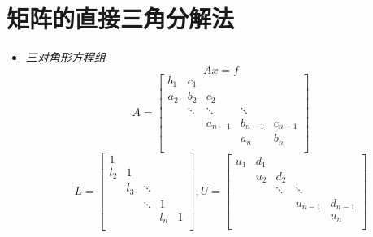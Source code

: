 \documentclass[twoside]{article}
\begin{document}
\section{矩阵的直接三角分解法}
\begin{itemize}
  \item \textit{三对角形方程组}
    \begin{equation}
      Ax=f
    \end{equation}
    \begin{equation}
      A =
      \begin{bmatrix}
        b_1 & c_1    &        &        & \\
        a_2 & b_2    & c_2    &        & \\
            & \ddots & \ddots & \ddots & \\
            &        & a_{n-1}& b_{n-1}& c_{n-1} \\
            &        &        & a_n    & b_n \\
      \end{bmatrix}
    \end{equation}
    \begin{equation}
      L =
      \begin{bmatrix}
        1   &        &        &        & \\
        l_2 & 1      &        &        & \\
            & l_3    & \ddots &        & \\
            &        & \ddots & 1      & \\
            &        &        & l_n    & 1 \\
      \end{bmatrix}
      , U =
      \begin{bmatrix}
        u_1 & d_1    &        &        & \\
            & u_2    & d_2    &        & \\
            &        & \ddots & \ddots & \\
            &        &        & u_{n-1}&d_{n-1} \\
            &        &        &        & u_n \\
      \end{bmatrix}
    \end{equation}
\end{itemize}
\end{document}
